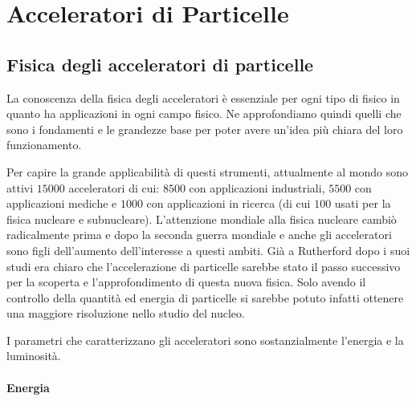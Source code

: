 
\section{Acceleratori di Particelle}

\subsection{Fisica degli acceleratori di particelle}
La conoscenza della fisica degli acceleratori è essenziale per ogni tipo di fisico in quanto ha applicazioni in ogni campo fisico.
Ne approfondiamo quindi quelli che sono i fondamenti e le grandezze base per poter avere un'idea più chiara del loro funzionamento.

Per capire la grande applicabilità di questi strumenti, attualmente al mondo sono attivi $15000$ acceleratori di cui: $8500$ con applicazioni industriali, $5500$ con applicazioni mediche e $1000$ con applicazioni in ricerca (di cui $100$ usati per la fisica nucleare e subnucleare).
L'attenzione mondiale alla fisica nucleare cambiò radicalmente prima e dopo la seconda guerra mondiale e anche gli acceleratori sono figli dell'aumento dell'interesse a questi ambiti.
Già a Rutherford dopo i suoi studi era chiaro che l'accelerazione di particelle sarebbe stato il passo successivo per la scoperta e l'approfondimento di questa nuova fisica.
Solo avendo il controllo della quantità ed energia di particelle si sarebbe potuto infatti ottenere una maggiore risoluzione nello studio del nucleo.

I parametri che caratterizzano gli acceleratori sono sostanzialmente l'energia e la luminosità.

\paragraph{Energia}

